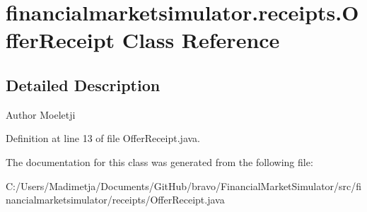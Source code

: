 \hypertarget{classfinancialmarketsimulator_1_1receipts_1_1_offer_receipt}{\section{financialmarketsimulator.\+receipts.\+Offer\+Receipt Class Reference}
\label{classfinancialmarketsimulator_1_1receipts_1_1_offer_receipt}
}


\subsection{Detailed Description}
\begin{DoxyAuthor}{Author}
Moeletji 
\end{DoxyAuthor}


Definition at line 13 of file Offer\+Receipt.\+java.



The documentation for this class was generated from the following file\+:\begin{DoxyCompactItemize}
\item 
C\+:/\+Users/\+Madimetja/\+Documents/\+Git\+Hub/bravo/\+Financial\+Market\+Simulator/src/financialmarketsimulator/receipts/Offer\+Receipt.\+java\end{DoxyCompactItemize}
